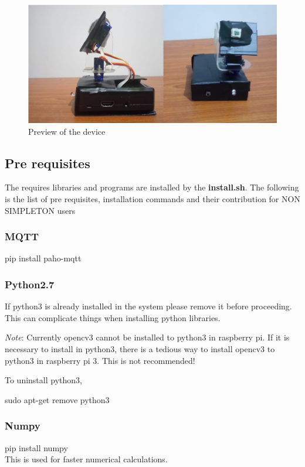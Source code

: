 \documentclass{report}
\begin{document}
\begin{figure}[H]
    \centering
    \includegraphics[scale=0.4]{device.jpg}
    \caption{Preview of the device}
    \label{fig:Preview of the final product}
\end{figure}

\subsection{Pre requisites}
The requires libraries and programs are installed by the \textbf{install.sh}. The following is the list of pre requisites, installation commands and their contribution for NON SIMPLETON users

\subsubsection{MQTT}
pip install paho-mqtt
\subsubsection{Python2.7}
If python3 is already installed in the system please remove it before proceeding. This can complicate things when installing python libraries.\newline

\emph{Note}: Currently opencv3 cannot be installed to python3 in raspberry pi. If it is necessary to install in python3, there is a tedious way to install opencv3 to python3 in raspberry pi 3. This is not recommended!\newline

To uninstall python3,\newline

sudo apt-get remove python3

\subsubsection{Numpy}
pip install numpy\\
This is used for faster numerical calculations.
\end{document}
